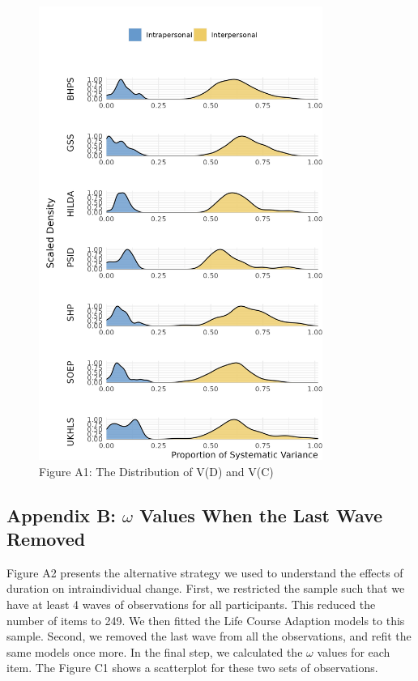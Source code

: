\documentclass[
  12pt,
]{article}
\begin{document}
\begin{figure}[htp]
\begin{center}
\caption*{Figure A1: The Distribution of V(D) and V(C)}

\includegraphics[width=350px]{../figures/figure_A1}

\end{center}
\end{figure}

\hypertarget{appendix-b-omega-values-when-the-last-wave-removed}{%
\subsection{\texorpdfstring{Appendix B: \(\omega\) Values When the Last
Wave
Removed}{Appendix B: \textbackslash omega Values When the Last Wave Removed}}\label{appendix-b-omega-values-when-the-last-wave-removed}}

Figure A2 presents the alternative strategy we used to understand the
effects of duration on intraindividual change. First, we restricted the
sample such that we have at least 4 waves of observations for all
participants. This reduced the number of items to 249. We then fitted
the Life Course Adaption models to this sample. Second, we removed the
last wave from all the observations, and refit the same models once
more. In the final step, we calculated the \(\omega\) values for each
item. The Figure C1 shows a scatterplot for these two sets of
observations.
\end{document}
